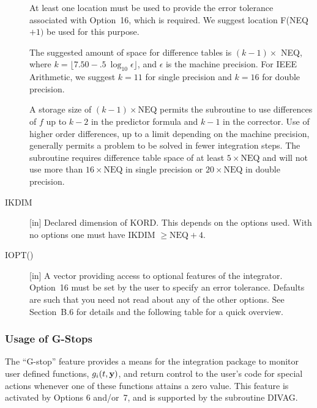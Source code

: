 \documentclass[twoside]{MATH77}
\begin{document}
\begin{description}
At least one location must be used to provide the error tolerance associated
with Option~16, which is required. We suggest location F(NEQ$+1)$ be used for
this purpose.

The suggested amount of space for difference tables is $(k-1)\times $
NEQ, where $k=\lfloor 7.50-.5\ \log _{10}\epsilon \rfloor $, and $%
\epsilon $ is the machine precision. For IEEE Arithmetic, we suggest $%
k=11 $ for single precision and $k=16$ for double precision.

A storage size of $(k-1)\times \text{NEQ}$ permits the subroutine to
use differences of $f$ up to $k-2$ in the predictor formula and $k-1$ in the
corrector. Use of higher order differences, up to a limit depending on the
machine precision, generally permits a problem to be solved in fewer
integration steps. The subroutine requires difference table space of at
least $5\times \text{NEQ}$ and will not use more than $16 \times \text{NEQ}$
in single precision or $20\times \text{NEQ}$ in
double precision.

\item[IKDIM]  [in] Declared dimension of KORD. This depends on the options
used. With no options one must have IKDIM $\geq \text{NEQ}+4.$

\item[IOPT()] [in] A vector providing access to optional features of the
  integrator. Option~16 must be set by the user to specify an error tolerance.
  Defaults are such that you need not read about any of the other options.
  See Section\ B.6 for details and the following table for a quick overview.
\end{description}

\subsubsection{Usage of G-Stops\label{GStops}}

The ``G-stop'' feature provides a means for the integration package to
monitor user defined functions, $g_i(t,{\bf y})$, and return control to the
user's code for special actions whenever one of these functions attains a
zero value. This feature is activated by Options 6 and/or~7, and is
supported by the subroutine DIVAG.
\end{document}
